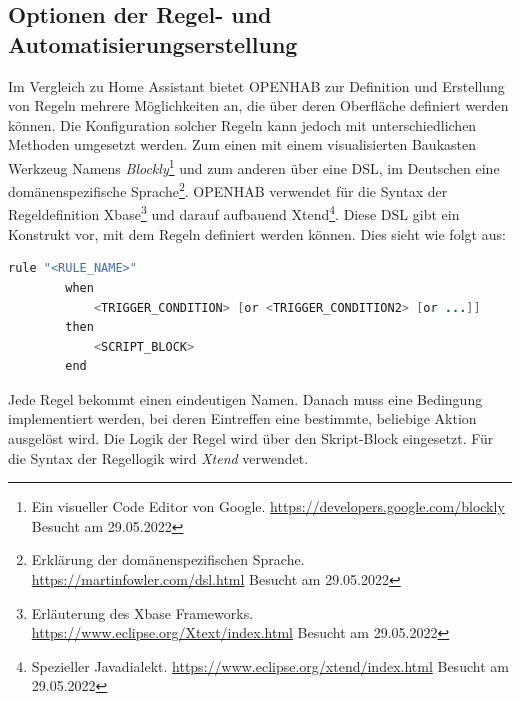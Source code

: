     \subsection{Optionen der Regel- und Automatisierungserstellung}
        Im Vergleich zu Home Assistant bietet \acs{OPENHAB} zur Definition und Erstellung von Regeln mehrere Möglichkeiten an, die über deren Oberfläche definiert werden können. 
        Die Konfiguration solcher Regeln kann jedoch mit unterschiedlichen Methoden umgesetzt werden. Zum 
        einen mit einem visualisierten Baukasten Werkzeug Namens \textit{Blockly}\footnote{Ein visueller Code Editor von Google. \url{https://developers.google.com/blockly} Besucht am 29.05.2022} 
        und zum anderen über eine \ac{DSL}, im Deutschen eine domänenspezifische Sprache\footnote{Erklärung der domänenspezifischen Sprache. \url{https://martinfowler.com/dsl.html} Besucht am 29.05.2022}. 
        \acs{OPENHAB} verwendet für die Syntax der Regeldefinition Xbase\footnote{Erläuterung des Xbase Frameworks. \url{https://www.eclipse.org/Xtext/index.html} Besucht am 29.05.2022} 
        und darauf aufbauend Xtend\footnote{Spezieller Javadialekt. \url{https://www.eclipse.org/xtend/index.html} Besucht am 29.05.2022}. 
        Diese \acs{DSL} gibt ein Konstrukt vor, mit dem Regeln definiert werden können. Dies sieht wie folgt aus:
        \\
        \begin{lstlisting}[language=Java, frame=lines, xleftmargin=\parindent, style=algoBericht, label={code:Xbase}, captionpos=b, caption={Konstrukt zur Regeldefinition über Xbase}]
        rule "<RULE_NAME>"
        when
            <TRIGGER_CONDITION> [or <TRIGGER_CONDITION2> [or ...]]            
        then
            <SCRIPT_BLOCK>
        end
        \end{lstlisting}
        Jede Regel bekommt einen eindeutigen Namen. Danach muss eine Bedingung implementiert werden, bei deren Eintreffen 
        eine bestimmte, beliebige Aktion ausgelöst wird. Die Logik der Regel wird über den Skript-Block eingesetzt. Für die Syntax 
        der Regellogik wird \textit{Xtend} verwendet. 

